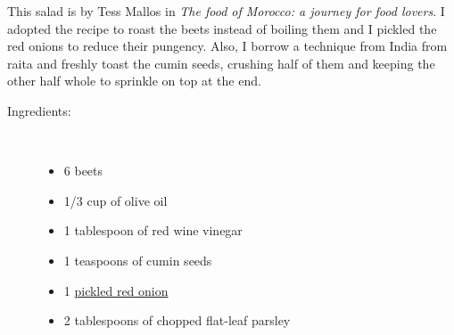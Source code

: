 \documentclass[11pt,letterpaper]{article}
\begin{document}


This salad is by Tess Mallos in {\it The food of Morocco: a journey for food lovers}. I adopted the recipe to roast the beets instead of boiling them and I pickled the red onions to reduce their pungency. Also, I borrow a technique from India from raita and freshly toast the cumin seeds, crushing half of them and keeping the other half whole to sprinkle on top at the end.

\begin{description}

\item[Ingredients:]\ \\
	\begin{itemize}
	\item 6 beets
	\item 1/3 cup of olive oil
	\item 1 tablespoon of red wine vinegar
	\item 1 teaspoons of cumin seeds
	\item 1 \href{PickledRedOnions.html}{pickled red onion}
	\item 2 tablespoons of chopped flat-leaf parsley
	\end{itemize}


\end{description}
\end{document}
